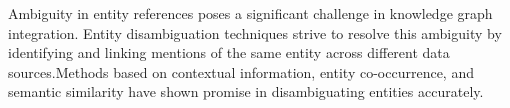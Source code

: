 Ambiguity in entity references poses a significant challenge in knowledge graph integration. Entity disambiguation techniques strive to resolve this ambiguity by identifying and linking mentions of the same entity across different data sources.Methods based on contextual information, entity co-occurrence, and semantic similarity have shown promise in disambiguating entities accurately.





